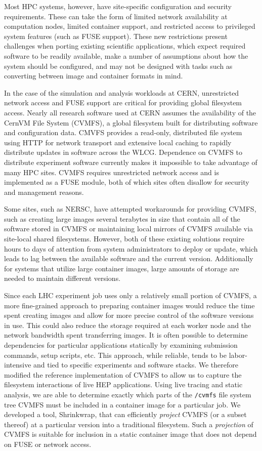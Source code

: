 \documentclass[sigconf]{acmart}
\begin{document}
Most HPC systems, however, have site-specific configuration and security requirements.
These can take the form of limited network availability at computation nodes,
limited container support,
and restricted access to privileged system features (such as FUSE support).
These new restrictions present challenges when porting existing scientific applications,
which expect required software to be readily available,
make a number of assumptions about how the system should be configured,
and may not be designed with tasks such as converting between image and container formats in mind.

In the case of the simulation and analysis workloads at CERN,
unrestricted network access and FUSE support are critical for providing global filesystem access.
Nearly all research software used at CERN assumes the availability of the CernVM File System (CVMFS),
a global filesystem built for distributing software and configuration data.
CMVFS provides a read-only, distributed file system using HTTP for network transport and extensive local
caching to rapidly distribute updates in software across the WLCG.
Dependence on CVMFS to distribute experiment software currently makes it impossible to take advantage of many HPC sites.
CVMFS requires unrestricted network access and is implemented as a FUSE module,
both of which sites often disallow for security and management reasons.

Some sites, such as NERSC,
have attempted workarounds for providing CVMFS,
such as creating large images several terabytes in size that contain all of the software stored in CVMFS or
maintaining local mirrors of CVMFS available via site-local shared filesystems.
However, both of these existing solutions require 
hours to days of attention from system administrators to deploy or update,
which leads to lag between the available software and the current version.
Additionally for systems that utilize large container images, large amounts of storage are needed to maintain different versions.

Since each LHC experiment job uses 
only a relatively small portion of CVMFS,
a more fine-grained approach to preparing container images would reduce the time spent creating images and allow for more precise control of the software versions in use.
This could also reduce the storage required at each worker node and the network bandwidth spent transferring images.
It is often possible to determine dependencies for particular applications statically by examining submission commands, setup scripts, etc.
This approach, while reliable, tends to be labor-intensive and tied to specific experiments and software stacks.
We therefore modified the reference implementation of CVMFS to allow us to capture the filesystem interactions of live HEP applications.
Using live tracing and static analysis,
we are able to determine exactly which parts of the \texttt{/cvmfs} file system tree CVMFS must be included in a container image for a particular job.
We developed a tool, Shrinkwrap, that can efficiently \emph{project} CVMFS (or a subset thereof) at a particular version into a traditional filesystem.
Such a \emph{projection} of CVMFS is suitable for inclusion in a static container image that does not depend on FUSE or network access.
\end{document}

